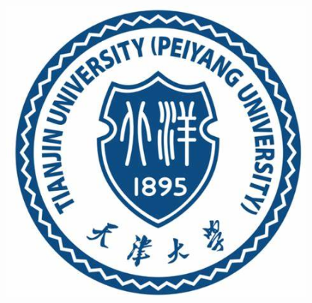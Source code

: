 \documentclass[11pt,a4paper,utf8]{article}
\title{\HUGE{\textbf{网络舆情分析行业大数据相关调查报告}}}
\author[1]{王红阳}
\author[2]{夏睿}
\author[3]{周浩然}
\author[4]{窦浩阳}
\affil[1]{天津大学智能与计算学部-3019244233}
\affil[2]{天津大学智能与计算学部-3019244105}
\affil[3]{天津大学智能与计算学部-3019244229}
\affil[4]{天津大学智能与计算学部-3019202235}
\begin{document}

\begin{figure}[t]
\centering
	\includegraphics[scale=0.6]{images/图标.png} 
\end{figure}


\maketitle %
 
 
 



\newpage %

\thispagestyle{empty} %
\renewcommand{\contentsname}{\centerline{ 目 \quad 录}}
\begin{center}
    \tableofcontents
\end{center}

\setcounter{page}{0}
\thispagestyle{empty} %
 
 
  
\newpage  
\end{document}
